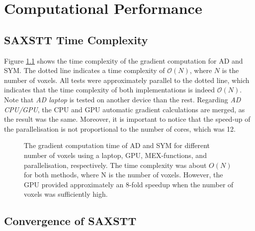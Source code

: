 \chapter{Computational Performance}



\section{SAXSTT Time Complexity}

Figure \ref{fig:gradient_time_complexity} shows the time complexity of the gradient computation for AD and SYM.
The dotted line indicates a time complexity of $\mathcal{O}(N)$, where $N$ is the number of voxels.
All tests were approximately parallel to the dotted line, which indicates that the time complexity of both implementations is indeed $\mathcal{O}(N)$.
Note that \emph{AD laptop} is tested on another device than the rest.
Regarding \emph{AD CPU/GPU}, the CPU and GPU automatic gradient calculations are merged, as the result was the same.
Moreover, it is important to notice that the speed-up of the parallelisation is not proportional to the number of cores, which was 12.
\begin{figure}[h!]
    \centering
    
    \caption{ The gradient computation time of AD and SYM for different number of voxels using a laptop, GPU, MEX-functions, and parallelisation, respectively. %
        The time complexity was about $O(N)$ for both methods, where N is the number of voxels. However, the GPU provided approximately an 8-fold speedup when the number of voxels was sufficiently high.}
    \label{fig:gradient_time_complexity}
\end{figure}

\clearpage
\section{Convergence of SAXSTT}

